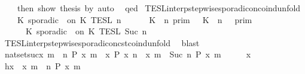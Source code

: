 \begin{isabellebody}
{\ \ \ \ then\ show\ {\isacharquery}thesis\ by\ auto\isanewline
\ \ qed\isanewline
}%
\endisatagproof
{\isafoldproof}%
%
\isadelimproof
\isanewline
%
\endisadelimproof
\isanewline
{}\isamarkupfalse%
\ TESL{\isacharunderscore}interp{\isacharunderscore}stepwise{\isacharunderscore}sporadicon{\isacharunderscore}coind{\isacharunderscore}unfold{\isacharcolon}\isanewline
\ \ \ {\isacartoucheopen}{\isasymlbrakk}\ K\ sporadic\ {\isasymtau}\ on\ K\ {\isasymrbrakk}\isactrlsub T\isactrlsub E\isactrlsub S\isactrlsub L\isactrlbsup {\isasymge}\ n\isactrlesup \ {\isacharequal}\isanewline
\ \ \ \ {\isasymlbrakk}\ K\ {\isasymUp}\ n\ {\isasymrbrakk}\isactrlsub p\isactrlsub r\isactrlsub i\isactrlsub m\ {\isasyminter}\ {\isasymlbrakk}\ K\ {\isasymDown}\ n\ {\isacharat}\ {\isasymtau}\ {\isasymrbrakk}\isactrlsub p\isactrlsub r\isactrlsub i\isactrlsub m\isanewline
\ \ \ \ {\isasymunion}\ {\isasymlbrakk}\ K\ sporadic\ {\isasymtau}\ on\ K\ {\isasymrbrakk}\isactrlsub T\isactrlsub E\isactrlsub S\isactrlsub L\isactrlbsup {\isasymge}\ Suc\ n\isactrlesup {\isacartoucheclose}\isanewline
%
\isadelimproof
\ \ %
\endisadelimproof
%
\isatagproof
{}\isamarkupfalse%
\ TESL{\isacharunderscore}interp{\isacharunderscore}stepwise{\isacharunderscore}sporadicon{\isacharunderscore}cst{\isacharunderscore}coind{\isacharunderscore}unfold\ \isamarkupfalse%
\ blast%
\endisatagproof
{\isafoldproof}%
%
\isadelimproof
\isanewline
%
\endisadelimproof
\isanewline
{}\isamarkupfalse%
\ nat{\isacharunderscore}set{\isacharunderscore}suc{\isacharcolon}{\isacartoucheopen}{\isacharbraceleft}x{\isachardot}\ {\isasymforall}m\ {\isasymge}\ n{\isachardot}\ P\ x\ m{\isacharbraceright}\ {\isacharequal}\ {\isacharbraceleft}x{\isachardot}\ P\ x\ n{\isacharbraceright}\ {\isasyminter}\ {\isacharbraceleft}x{\isachardot}\ {\isasymforall}m\ {\isasymge}\ Suc\ n{\isachardot}\ P\ x\ m{\isacharbraceright}{\isacartoucheclose}\isanewline
%
\isadelimproof
%
\endisadelimproof
%
\isatagproof
{}\isamarkupfalse%
\isanewline
\ \ \isacommand{{\isacharbraceleft}}\isamarkupfalse%
\ \isamarkupfalse%
\ x\isanewline
\ \ \ \ \isamarkupfalse%
\ h{\isacharcolon}{\isacartoucheopen}x\ {\isasymin}\ {\isacharbraceleft}x{\isachardot}\ {\isasymforall}m\ {\isasymge}\ n{\isachardot}\ P\ x\ m{\isacharbraceright}{\isacartoucheclose}\isanewline
\ \ \ \ \isamarkupfalse%

\end{isabellebody}
